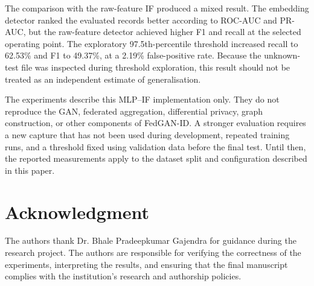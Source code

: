 \documentclass[journal]{IEEEtran}
\begin{document}
The comparison with the raw-feature IF produced a mixed result. The embedding detector ranked the evaluated records better according to ROC-AUC and PR-AUC, but the raw-feature detector achieved higher F1 and recall at the selected operating point. The exploratory 97.5th-percentile threshold increased recall to 62.53\% and F1 to 49.37\%, at a 2.19\% false-positive rate. Because the unknown-test file was inspected during threshold exploration, this result should not be treated as an independent estimate of generalisation.

The experiments describe this MLP--IF implementation only. They do not reproduce the GAN, federated aggregation, differential privacy, graph construction, or other components of FedGAN-ID. A stronger evaluation requires a new capture that has not been used during development, repeated training runs, and a threshold fixed using validation data before the final test. Until then, the reported measurements apply to the dataset split and configuration described in this paper.

\section*{Acknowledgment}
The authors thank Dr. Bhale Pradeepkumar Gajendra for guidance during the research project. The authors are responsible for verifying the correctness of the experiments, interpreting the results, and ensuring that the final manuscript complies with the institution's research and authorship policies.

\balance


\end{document}
